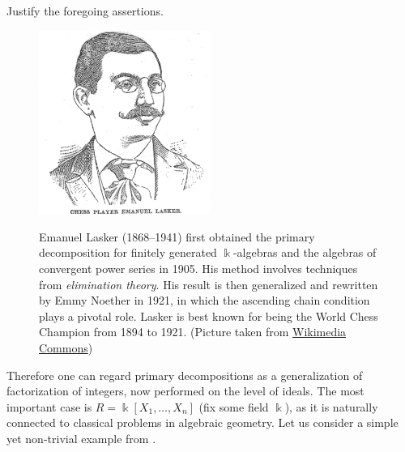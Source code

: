 \begin{exercise}
	Justify the foregoing assertions.
\end{exercise}

\begin{figure}[h]
	\centering \includegraphics[height=170pt]{ELasker.jpg} \\ \vspace{1em}
	\begin{minipage}{0.7\textwidth}
		\small Emanuel Lasker (1868--1941) first obtained the primary decomposition for finitely generated $\Bbbk$-algebras and the algebras of convergent power series in 1905. His method involves techniques from \emph{elimination theory}. His result is then generalized and rewritten by Emmy Noether in 1921, in which the ascending chain condition plays a pivotal role. Lasker is best known for being the World Chess Champion from 1894 to 1921. (Picture taken from \href{https://commons.wikimedia.org/w/index.php?curid=5676713}{Wikimedia Commons})
	\end{minipage}
\end{figure}

Therefore one can regard primary decompositions as a generalization of factorization of integers, now performed on the level of ideals. The most important case is $R = \Bbbk[X_1, \ldots, X_n]$ (fix some field $\Bbbk$), as it is naturally connected to classical problems in algebraic geometry. Let us consider a simple yet non-trivial example from \cite[\S 3]{Eis95}.

